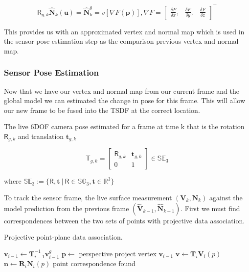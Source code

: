\documentclass[10pt, twocolumn]{article}
\begin{document}
\begin{equation}
\mathsf{R}_{g,k} \mathbf{\hat{N}}_{k} (\mathbf{u}) = \mathbf{\hat{N}}^{g}_{k} = v[\nabla F(\mathbf{p})], \nabla F = 
\begin{bmatrix}
    \frac{\delta F}{\delta x}, & \frac{\delta F}{\delta y}, & \frac{\delta F}{\delta z}
\end{bmatrix}^{\top}
\end{equation}

This provides us with an approximated vertex and normal map which is used in the sensor pose estimation step as the comparison previous vertex and normal map.


\subsubsection{Sensor Pose Estimation} \label{sec:pose}
Now that we have our vertex and normal map from our current frame and the global model we can estimated the change in pose for this frame. This will allow our new frame to be fused into the TSDF at the correct location.

The live 6DOF camera pose estimated for a frame at time k that is the rotation $\mathsf{R}_{g,k}$ and translation $\mathbf{t}_{g,k}$

\begin{equation}
\mathsf{T}_{g,k} = 
\begin{bmatrix}
  \mathsf{R}_{g,k} & \mathbf{t}_{g,k} \\
  0 & 1
\end{bmatrix}
\in \mathbb{SE}_{3}
\end{equation}

where $\mathbb{SE}_{3} := \{\mathsf{R}, \mathbf{t}\ |\ \mathsf{R} \in \mathbb{SO}_{3}, \mathbf{t} \in \mathbb{R}^{3}\}$

\hfill \break

To track the sensor frame, the live surface measurement $(\mathbf{V}_{k}, \mathbf{N}_{k})$ against the model prediction from the previous frame $(\mathbf{\hat{V}}_{k-1}, \mathbf{\hat{N}}_{k-1})$. First we must find correspondences between the two sets of points with projective data association. 


\begin{algorithm}
\caption{Projective point-plane data association.}\label{euclid}
\begin{algorithmic}[1]
\State $\mathbf{v}_{i-1} \leftarrow \mathbf{T}^{-1}_{i-1} \mathbf{v}^{g}_{i-1}$
\State $\mathbf{p} \leftarrow$ perspective project vertex $\mathbf{v}_{i-1}$
\State $\mathbf{v} \leftarrow \mathbf{T}_i \mathbf{V}_i(p)$
\State $\mathbf{n} \leftarrow \mathbf{R}_i \mathbf{N}_i(p)$
\State point correspondence found
\EndIf
\EndIf
\EndIf
\EndFor
\end{algorithmic}
\end{algorithm}
\end{document}
